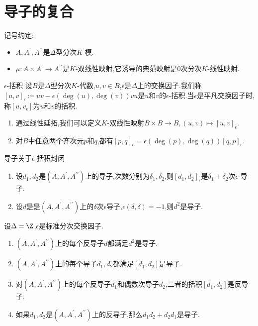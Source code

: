 \section{导子的复合}

记号约定:
\begin{itemize}
	\item $A,A^{\prime},A^{\prime\prime}$是$\Delta$型分次$K$-模.
	\item $\mu:A\times A^{\prime}\to A^{\prime\prime}$是$K$-双线性映射,它诱导的典范映射是$0$次分次$K$-线性映射.
\end{itemize}

\begin{definition}{$\epsilon$-括积}{}
	设$B$是$\Delta$型分次$K$-代数,$u,v\in B$,$\epsilon$是$\Delta$上的交换因子.我们称$\left[u,v\right]_{\epsilon}\coloneq uv-\epsilon\left(\deg\left(u\right),\deg\left(v\right)\right)vu$是$u$和$v$的$\epsilon$-括积.当$\epsilon$是平凡交换因子时,称$\left[u,v_{\epsilon}\right]$为$u$和$v$的括积.
\end{definition}

\begin{remark}{}{}
	\begin{enumerate}
		\item 通过线性延拓,我们可以定义$K$-双线性映射$B\times B\to B,\left(u,v\right)\mapsto\left[u,v\right]_{\epsilon}$.
		\item 对$B$中任意两个齐次元$p$和$q$,都有$\left[p,q\right]_{\epsilon}=\epsilon\left(\deg\left(p\right),\deg\left(q\right)\right)\left[q,p\right]_{\epsilon}$.
	\end{enumerate}
\end{remark}

\begin{proposition}{导子关于$\epsilon$-括积封闭}{}
	\begin{enumerate}
		\item 设$d_{1},d_{2}$是$\left(A,A^{\prime},A^{\prime\prime}\right)$上的导子,次数分别为$\delta_{1},\delta_{2}$,则$\left[d_{1},d_{2}\right]_{\epsilon}$是$\delta_{1}+\delta_{2}$次$\epsilon$-导子.
		\item 设$d$是是$\left(A,A^{\prime},A^{\prime\prime}\right)$上的$\delta$次$\epsilon$导子,$\epsilon\left(\delta,\delta\right)=-1$,则$d^{2}$是导子.
	\end{enumerate}
\end{proposition}

\begin{corollary}{}{}
	设$\Delta=\Z$,$\epsilon$是标准分次交换因子.
	\begin{enumerate}
		\item $\left(A,A^{\prime},A^{\prime\prime}\right)$上的每个反导子$d$都满足$d^{2}$是导子.
		\item $\left(A,A^{\prime},A^{\prime\prime}\right)$上的每个导子$d_{1},d_{2}$都满足$\left[d_{1},d_{2}\right]$是导子.
		\item 对$\left(A,A^{\prime},A^{\prime\prime}\right)$上的每个反导子$d_{1}$和偶数次导子$d_{2}$,二者的括积$\left[d_{1},d_{2}\right]$是反导子.
		\item 如果$d_{1},d_{2}$是$\left(A,A^{\prime},A^{\prime\prime}\right)$上的反导子,那么$d_{1}d_{2}+d_{2}d_{1}$是导子.
	\end{enumerate}
\end{corollary}

